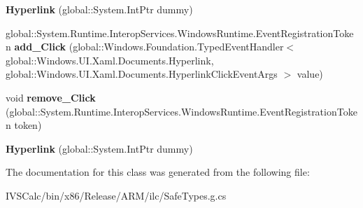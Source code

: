 \begin{DoxyCompactItemize}
\mbox{\label{class_windows_1_1_u_i_1_1_xaml_1_1_documents_1_1_hyperlink_a08712572a1cb4eedfbd6f7cd2c4acc27}} 
{\bfseries Hyperlink} (global\+::\+System.\+Int\+Ptr dummy)
\item 
\mbox{\label{class_windows_1_1_u_i_1_1_xaml_1_1_documents_1_1_hyperlink_affeaa11b3385e3c202507e52f89e8e9c}} 
global\+::\+System.\+Runtime.\+Interop\+Services.\+Windows\+Runtime.\+Event\+Registration\+Token {\bfseries add\+\_\+\+Click} (global\+::\+Windows.\+Foundation.\+Typed\+Event\+Handler$<$ global\+::\+Windows.\+U\+I.\+Xaml.\+Documents.\+Hyperlink, global\+::\+Windows.\+U\+I.\+Xaml.\+Documents.\+Hyperlink\+Click\+Event\+Args $>$ value)
\item 
\mbox{\label{class_windows_1_1_u_i_1_1_xaml_1_1_documents_1_1_hyperlink_af58bad7f30cb13f3d129ef81adcd34cb}} 
void {\bfseries remove\+\_\+\+Click} (global\+::\+System.\+Runtime.\+Interop\+Services.\+Windows\+Runtime.\+Event\+Registration\+Token token)
\item 
\mbox{\label{class_windows_1_1_u_i_1_1_xaml_1_1_documents_1_1_hyperlink_a08712572a1cb4eedfbd6f7cd2c4acc27}} 
{\bfseries Hyperlink} (global\+::\+System.\+Int\+Ptr dummy)
\end{DoxyCompactItemize}


The documentation for this class was generated from the following file\+:\begin{DoxyCompactItemize}
\item 
I\+V\+S\+Calc/bin/x86/\+Release/\+A\+R\+M/ilc/Safe\+Types.\+g.\+cs\end{DoxyCompactItemize}

